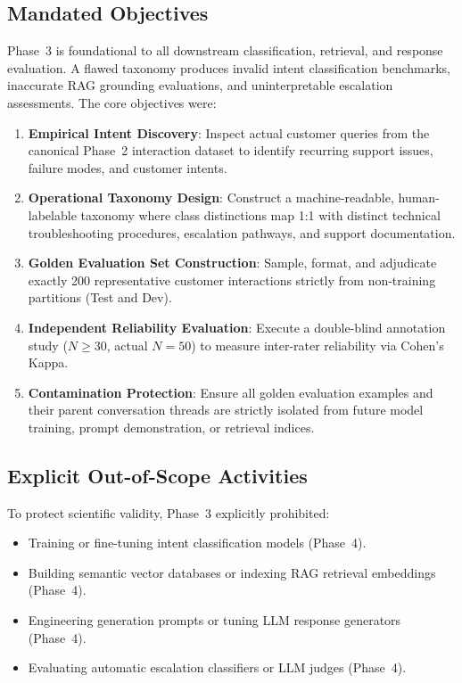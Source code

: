 \documentclass[11pt,a4paper]{article}
\begin{document}
\subsection{Mandated Objectives}
Phase~3 is foundational to all downstream classification, retrieval, and response evaluation. A flawed taxonomy produces invalid intent classification benchmarks, inaccurate RAG grounding evaluations, and uninterpretable escalation assessments. The core objectives were:
\begin{enumerate}[leftmargin=*]
    \item \textbf{Empirical Intent Discovery}: Inspect actual customer queries from the canonical Phase~2 interaction dataset to identify recurring support issues, failure modes, and customer intents.
    \item \textbf{Operational Taxonomy Design}: Construct a machine-readable, human-labelable taxonomy where class distinctions map 1:1 with distinct technical troubleshooting procedures, escalation pathways, and support documentation.
    \item \textbf{Golden Evaluation Set Construction}: Sample, format, and adjudicate exactly 200 representative customer interactions strictly from non-training partitions (Test and Dev).
    \item \textbf{Independent Reliability Evaluation}: Execute a double-blind annotation study ($N \ge 30$, actual $N = 50$) to measure inter-rater reliability via Cohen's Kappa.
    \item \textbf{Contamination Protection}: Ensure all golden evaluation examples and their parent conversation threads are strictly isolated from future model training, prompt demonstration, or retrieval indices.
\end{enumerate}

\subsection{Explicit Out-of-Scope Activities}
To protect scientific validity, Phase~3 explicitly prohibited:
\begin{itemize}[leftmargin=*]
    \item Training or fine-tuning intent classification models (Phase~4).
    \item Building semantic vector databases or indexing RAG retrieval embeddings (Phase~4).
    \item Engineering generation prompts or tuning LLM response generators (Phase~4).
    \item Evaluating automatic escalation classifiers or LLM judges (Phase~4).
\end{itemize}
\end{document}
